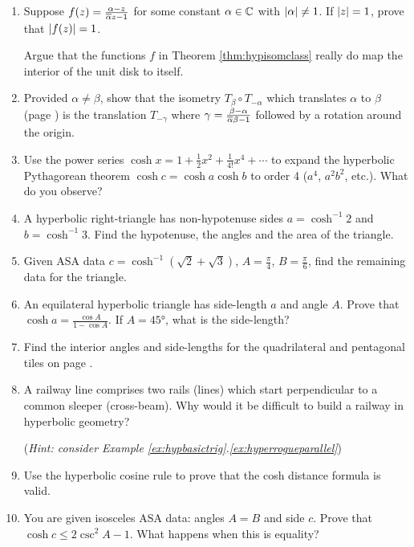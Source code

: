 \begin{exercises}
\begin{enumerate}
	  
	  \item Suppose $f(z)=\frac{\alpha-z}{\overline{\alpha} z-1}$ for some constant $\alpha\in\mathbb{C}$ with $\left| \alpha\right|\neq 1$. If $\left| z\right|=1$, prove that $\left| f(z)\right|=1$.\par
	  Argue that the functions $f$ in Theorem \ref{thm:hypisomclass} really do map the interior of the unit disk to itself.
	  
	  
 		\item Provided $\alpha\neq\beta$, show that the isometry $T_\beta\circ T_{-\alpha}$ which translates $\alpha$ to $\beta$ (page \pageref{pg:hypisomclass}) is the translation $T_{-\gamma}$ where $\gamma=\frac{\beta-\alpha}{\overline{\alpha}\beta-1}$ followed by a rotation around the origin.
	
	  
		\item Use the power series $\cosh x=1+\frac 12x^2+\frac 1{4!}x^4+\cdots$ to expand the hyperbolic Pythagorean theorem $\cosh c=\cosh a\cosh b$ to order 4 ($a^4$, $a^2b^2$, etc.). What do you observe?
	
	  
	  \item A hyperbolic right-triangle has non-hypotenuse sides $a=\cosh^{-1}2$ and $b=\cosh^{-1}3$. Find the hypotenuse, the angles and the area of the triangle.
	  
	  
		\item Given ASA data $c=\cosh^{-1}(\sqrt 2+\sqrt 3)$, $A=\frac\pi 4$, $B=\frac\pi 6$, find the remaining data for the triangle.
	  
	  
		\item An equilateral hyperbolic triangle has side-length $a$ and angle $A$. Prove that $\cosh a =\frac{\cos A}{1-\cos A}$. If $A=\ang{45}$, what is the side-length?
		
		
		\item Find the interior angles and side-lengths for the quadrilateral and pentagonal tiles on page \pageref{pg:hyptiling}.
		
		
		\item A railway line comprises two rails (lines) which start perpendicular to a common sleeper (cross-beam). Why would it be difficult to build a railway in hyperbolic geometry?\par
		(\emph{Hint: consider Example \ref*{ex:hypbasictrig}.\ref{ex:hyperrogueparallel}})
		
		 
		\item Use the hyperbolic cosine rule to prove that the cosh distance formula is valid.
	
		
		\item You are given isosceles ASA data: angles $A=B$ and side $c$. Prove that $\cosh c\le 2\csc^2A-1$. What happens when this is equality?
		

\end{enumerate}
\end{exercises}
